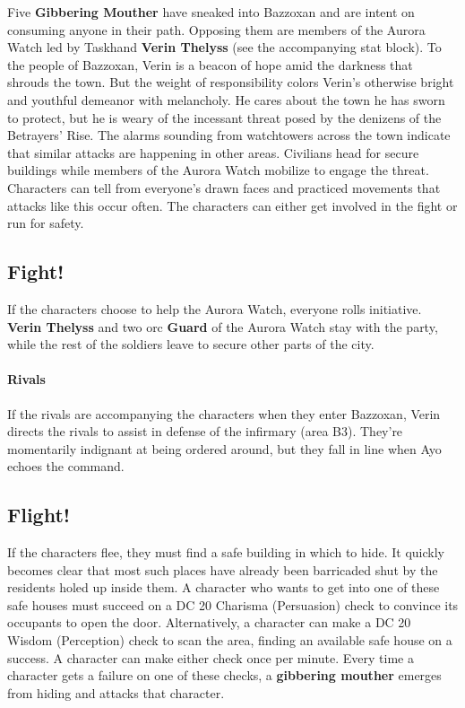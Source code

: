 \documentclass[10pt,a4,twoside,twocolumn,openany,nodeprecatedcode]{dndbook}
\begin{document}
Five \textbf{Gibbering Mouther} have sneaked into Bazzoxan and are intent on consuming anyone in their path. Opposing them are members of the Aurora Watch led by Taskhand \textbf{Verin Thelyss} (see the accompanying stat block).
To the people of Bazzoxan, Verin is a beacon of hope amid the darkness that shrouds the town. But the weight of responsibility colors Verin's otherwise bright and youthful demeanor with melancholy. He cares about the town he has sworn to protect, but he is weary of the incessant threat posed by the denizens of the Betrayers' Rise.
The alarms sounding from watchtowers across the town indicate that similar attacks are happening in other areas. Civilians head for secure buildings while members of the Aurora Watch mobilize to engage the threat. Characters can tell from everyone's drawn faces and practiced movements that attacks like this occur often. The characters can either get involved in the fight or run for safety.
\subsection{Fight!}
If the characters choose to help the Aurora Watch, everyone rolls initiative. \textbf{Verin Thelyss} and two orc \textbf{Guard} of the Aurora Watch stay with the party, while the rest of the soldiers leave to secure other parts of the city.
\paragraph{Rivals}
If the rivals are accompanying the characters when they enter Bazzoxan, Verin directs the rivals to assist in defense of the infirmary (area B3). They're momentarily indignant at being ordered around, but they fall in line when Ayo echoes the command.
\subsection{Flight!}
If the characters flee, they must find a safe building in which to hide. It quickly becomes clear that most such places have already been barricaded shut by the residents holed up inside them. A character who wants to get into one of these safe houses must succeed on a DC 20 Charisma (Persuasion) check to convince its occupants to open the door. Alternatively, a character can make a DC 20 Wisdom (Perception) check to scan the area, finding an available safe house on a success. A character can make either check once per minute. Every time a character gets a failure on one of these checks, a \textbf{gibbering mouther} emerges from hiding and attacks that character.
\end{document}
